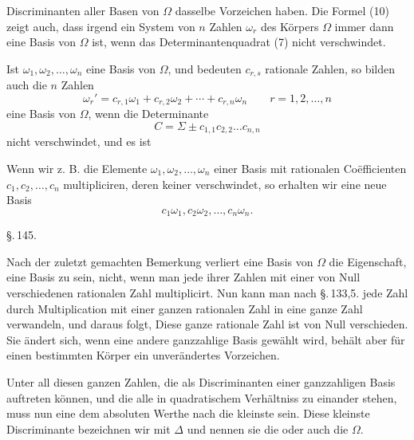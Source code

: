 Discriminanten aller Basen von $\Omega$ dasselbe Vorzeichen haben. Die Formel (10) zeigt auch, dass irgend ein System von $n$ Zahlen $\omega_r$ des Körpers $\Omega$ immer dann eine Basis von $\Omega$ ist, wenn das Determinantenquadrat (7) nicht verschwindet.

Ist $\omega_1, \omega_2, \ldots, \omega_n$ eine Basis von $\Omega$, und bedeuten $c_{r,s}$ rationale Zahlen, so bilden auch die $n$ Zahlen
\[
\omega_r' = c_{r,1}\omega_1 + c_{r,2}\omega_2 + \cdots + c_{r,n}\omega_n \qquad r = 1, 2, \ldots, n
\]
eine Basis von $\Omega$, wenn die Determinante
\[
C = \Sigma \pm c_{1,1}c_{2,2} \ldots c_{n,n}
\]
nicht verschwindet, und es ist

Wenn wir z. B. die Elemente $\omega_1, \omega_2, \ldots, \omega_n$ einer Basis mit rationalen Coëfficienten $c_1, c_2, \ldots, c_n$ multipliciren, deren keiner verschwindet, so erhalten wir eine neue Basis
\[
c_1\omega_1, c_2\omega_2, \ldots, c_n\omega_n.
\]

\begin{center}
\S.\,145.

\end{center}

Nach der zuletzt gemachten Bemerkung verliert eine Basis von $\Omega$ die Eigenschaft, eine Basis zu sein, nicht, wenn man jede ihrer Zahlen mit einer von Null verschiedenen rationalen Zahl multiplicirt. Nun kann man nach \S.\,133,5. jede Zahl durch Multiplication mit einer ganzen rationalen Zahl in eine ganze Zahl verwandeln, und daraus folgt,  Diese ganze rationale Zahl ist von Null verschieden. Sie ändert sich, wenn eine andere ganzzahlige Basis gewählt wird, behält aber für einen bestimmten Körper ein unverändertes Vorzeichen.

Unter all diesen ganzen Zahlen, die als Discriminanten einer ganzzahligen Basis auftreten können, und die alle in quadratischem Verhältniss zu einander stehen, muss nun eine dem absoluten Werthe nach die kleinste sein. Diese kleinste Discriminante bezeichnen wir mit $\varDelta$ und nennen sie die  oder auch die  $\Omega$.
